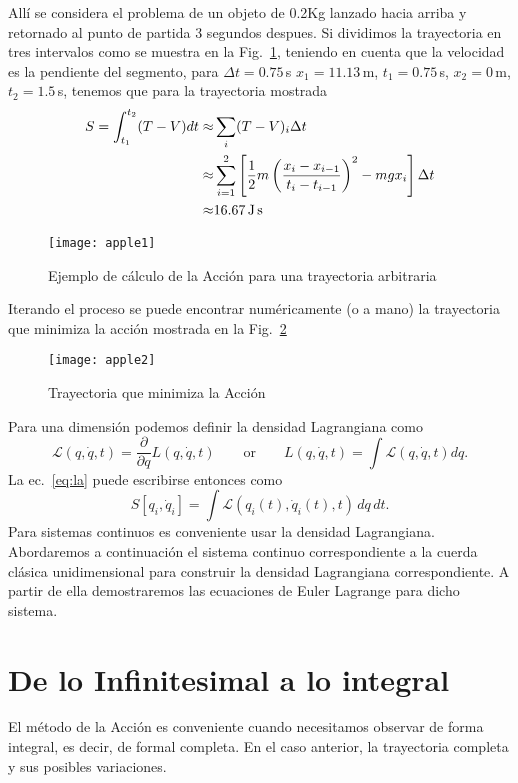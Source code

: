 Allí se considera el problema de un objeto de 0.2Kg lanzado hacia arriba y retornado al punto de partida 3 segundos despues. Si dividimos la trayectoria en tres intervalos como se muestra en la Fig.~\ref{fig:apple1}, teniendo en cuenta que la velocidad es la pendiente del segmento, para $\Delta t=0.75\,$s $x_1=11.13\,$m, $t_1=0.75\,$s, $x_2=0\,$m, $t_2=1.5\,$s, tenemos que para la trayectoria mostrada
\begin{align}
  S=\int_{t_1}^{t_2}(T-V)dt\approx&\sum_i(T-V)_i\Delta t\nonumber\\
  \approx&\sum_{i=1}^2\left[\frac{1}{2}m\left(\frac{x_i-x_{i-1}}{t_i-t_{i-1}}\right)^2-m g x_i\right]\Delta t\nonumber\\
  \approx&16.67\,\text{J\,s}
\end{align}
\begin{figure}
  \centering
  \texttt{[image: apple1]}
  \caption{Ejemplo de cálculo de la Acción para una trayectoria arbitraria}
  \label{fig:apple1}
\end{figure}
Iterando el proceso se puede encontrar numéricamente (o a mano) la trayectoria que minimiza la acción mostrada en la Fig.~\ref{fig:apple2}
\begin{figure}
  \centering
\texttt{[image: apple2]}
  \caption{Trayectoria que minimiza la Acción}
\label{fig:apple2}
\end{figure}
Para una dimensión podemos definir la densidad Lagrangiana como
\begin{equation}
  \mathcal{L}(q,\dot q,t)=\frac{\partial}{\partial q}L(q,\dot q,t)\qquad\text{or}\qquad L(q,\dot q,t)=\int\mathcal{L}(q,\dot q,t)dq.
\end{equation}
La ec.~\eqref{eq:la} puede escribirse entonces como
\begin{equation}
   S\left[q_i,\dot{q}_i\right] = \int \mathcal{L}(q_i(t), \dot{q}_i(t),t)\, dq\,dt.
\end{equation}
Para sistemas continuos es conveniente usar la densidad Lagrangiana. Abordaremos a continuación el sistema continuo correspondiente a la cuerda clásica unidimensional para construir la densidad Lagrangiana correspondiente. A partir de ella demostraremos las ecuaciones de Euler Lagrange para dicho sistema.


\section{De lo Infinitesimal a lo integral}
El método de la Acción es conveniente cuando necesitamos observar de forma integral, es decir, de formal completa. En el caso anterior, la trayectoria completa y sus posibles variaciones.


